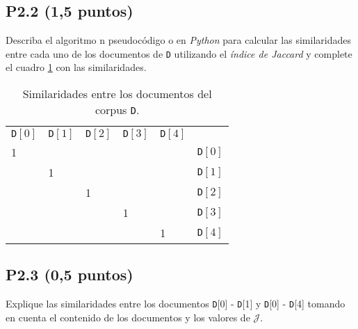 \documentclass{article}
\begin{document}
\subsection*{P2.2 (1,5 puntos)}

Describa el algoritmo n pseudocódigo o en \textit{Python} para calcular las similaridades entre cada uno de los documentos de \texttt{D} utilizando el \textit{índice de Jaccard} y complete el cuadro \ref{table:p12} con las similaridades.

\begin{table}[h!]
	\centering
	\begin{tabular}{llllll}
		\texttt{D}$[0]$         & \texttt{D}$[1]$        & \texttt{D}$[2]$        & \texttt{D}$[3]$        & \texttt{D}$[4]$        &                 \\ \cline{1-5}
		\multicolumn{1}{|l|}{1} & \multicolumn{1}{l|}{}  & \multicolumn{1}{l|}{}  & \multicolumn{1}{l|}{}  & \multicolumn{1}{l|}{}  & \texttt{D}$[0]$ \\[2ex] \cline{1-5}
		\multicolumn{1}{l|}{}   & \multicolumn{1}{l|}{1} & \multicolumn{1}{l|}{}  & \multicolumn{1}{l|}{}  & \multicolumn{1}{l|}{}  & \texttt{D}$[1]$ \\[2ex] \cline{2-5}
		                        & \multicolumn{1}{l|}{}  & \multicolumn{1}{l|}{1} & \multicolumn{1}{l|}{}  & \multicolumn{1}{l|}{}  & \texttt{D}$[2]$ \\[2ex] \cline{3-5}
		                        &                        & \multicolumn{1}{l|}{}  & \multicolumn{1}{l|}{1} & \multicolumn{1}{l|}{}  & \texttt{D}$[3]$ \\[2ex] \cline{4-5}
		                        &                        &                        & \multicolumn{1}{l|}{}  & \multicolumn{1}{l|}{1} & \texttt{D}$[4]$ \\[2ex] \cline{5-5}
	\end{tabular}
	\caption{Similaridades entre los documentos del corpus \texttt{D}.}
	\label{table:p12}
\end{table}

\subsection*{P2.3 (0,5 puntos)}

Explique las similaridades entre los documentos \texttt{D}[0] - \texttt{D}[1] y \texttt{D}[0] - \texttt{D}[4] tomando en cuenta el contenido de los documentos y los valores de $\mathcal{J}$.
\end{document}
